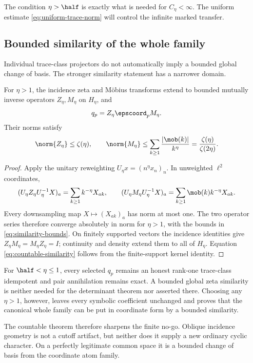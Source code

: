 The condition \(\eta>\half\) is exactly what is needed for
\(C_\eta<\infty\). The uniform estimate
\eqref{eq:uniform-trace-norm} will control the infinite marked transfer.

\subsection{Bounded similarity of the whole family}

Individual trace-class projectors do not automatically imply a bounded
global change of basis. The stronger similarity statement has a narrower
domain.

\begin{theorem}
\label{thm:global-similarity}
For \(\eta>1\), the incidence zeta and Möbius transforms extend to bounded
mutually inverse operators \(Z_\eta,M_\eta\) on \(H_\eta\), and
\begin{equation}
q_p=Z_\eta\epscoord_pM_\eta.
\label{eq:countable-similarity}
\end{equation}
Their norms satisfy
\begin{equation}
\norm{Z_\eta}\le\zeta(\eta),
\qquad
\norm{M_\eta}
\le\sum_{k\ge1}\frac{|\mob(k)|}{k^\eta}
=\frac{\zeta(\eta)}{\zeta(2\eta)}.
\label{eq:similarity-bounds}
\end{equation}
\end{theorem}

\begin{proof}
Apply the unitary reweighting \(U_\eta x=(n^\eta x_n)_n\). In unweighted
\(\ell^2\) coordinates,
\begin{equation}
(U_\eta Z_\eta U_\eta^{-1}X)_a
=\sum_{k\ge1}k^{-\eta}X_{ak},
\qquad
(U_\eta M_\eta U_\eta^{-1}X)_a
=\sum_{k\ge1}\mob(k)k^{-\eta}X_{ak}.
\label{eq:downsampling-series}
\end{equation}
Every downsampling map \(X\mapsto(X_{ak})_a\) has norm at most one. The two
operator series therefore converge absolutely in norm for \(\eta>1\), with
the bounds in \eqref{eq:similarity-bounds}. On finitely supported vectors the
incidence identities give \(Z_\eta M_\eta=M_\eta Z_\eta=I\); continuity and
density extend them to all of \(H_\eta\). Equation
\eqref{eq:countable-similarity} follows from the finite-support kernel
identity.
\end{proof}

\begin{remark}
\label{rem:intermediate-eta}
For \(\half<\eta\le1\), every selected \(q_p\) remains an honest rank-one
trace-class idempotent and pair annihilation remains exact. A bounded global
zeta similarity is neither needed for the determinant theorem nor asserted
there. Choosing any \(\eta>1\), however, leaves every symbolic coefficient
unchanged and proves that the canonical whole family can be put in coordinate
form by a bounded similarity.
\end{remark}

The countable theorem therefore sharpens the finite no-go. Oblique incidence
geometry is not a cutoff artifact, but neither does it supply a new ordinary
cyclic character. On a perfectly legitimate common space it is a bounded
change of basis from the coordinate atom family.
